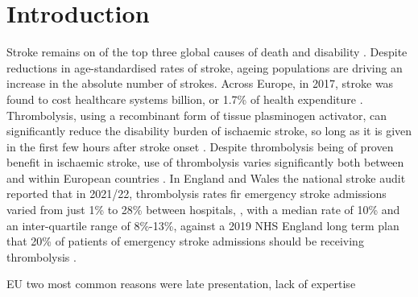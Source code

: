\section{Introduction}



Stroke remains on of the top three global causes of death and disability \cite{feigin_global_2021}. Despite reductions in age-standardised rates of stroke, ageing populations are driving an increase in the absolute number of strokes\cite{feigin_global_2021}. Across Europe, in 2017, stroke was found to cost healthcare systems  billion, or 1.7\% of health expenditure \cite{luengo-fernandez_economic_2020}. Thrombolysis, using a recombinant form of tissue plasminogen activator, can significantly reduce the disability burden of ischaemic stroke, so long as it is given in the first few hours after stroke onset \cite{emberson_effect_2014}. Despite thrombolysis being of proven benefit in ischaemic stroke, use of thrombolysis varies significantly both between and within European countries \cite{aguiar_de_sousa_access_2019}. In England and Wales the national stroke audit reported that in 2021/22, thrombolysis rates fir emergency stroke admissions varied from just 1\% to 28\% between hospitals, \cite{sentinel_national_stroke_audit_programme_ssnap_2022}, with a median rate of 10\% and an inter-quartile range of 8\%-13\%, against a 2019 NHS England long term plan that 20\% of patients of emergency stroke admissions should be receiving thrombolysis \cite{nhs_long_term_plan_2019}.


EU two most common reasons were late presentation, lack of expertise